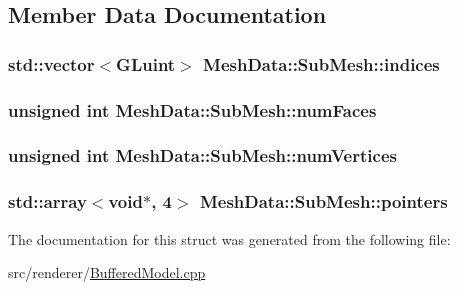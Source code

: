 \subsection{Member Data Documentation}
\hypertarget{structMeshData_1_1SubMesh_a3ddfe66733b41299f885428c38ab5bca}{
\subsubsection[{indices}]{\setlength{\rightskip}{0pt plus 5cm}std\-::vector$<${\bf G\-Luint}$>$ Mesh\-Data\-::\-Sub\-Mesh\-::indices}}\label{structMeshData_1_1SubMesh_a3ddfe66733b41299f885428c38ab5bca}
\hypertarget{structMeshData_1_1SubMesh_a7eb344d66f099df939c1f9b22a24470d}{
\subsubsection[{num\-Faces}]{\setlength{\rightskip}{0pt plus 5cm}unsigned int Mesh\-Data\-::\-Sub\-Mesh\-::num\-Faces}}\label{structMeshData_1_1SubMesh_a7eb344d66f099df939c1f9b22a24470d}
\hypertarget{structMeshData_1_1SubMesh_af8d61f18a35765e1103e5f68f1ad2dfa}{
\subsubsection[{num\-Vertices}]{\setlength{\rightskip}{0pt plus 5cm}unsigned int Mesh\-Data\-::\-Sub\-Mesh\-::num\-Vertices}}\label{structMeshData_1_1SubMesh_af8d61f18a35765e1103e5f68f1ad2dfa}
\hypertarget{structMeshData_1_1SubMesh_a82f8f81b976a144692e020e09598da3d}{
\subsubsection[{pointers}]{\setlength{\rightskip}{0pt plus 5cm}std\-::array$<$void$\ast$, 4$>$ Mesh\-Data\-::\-Sub\-Mesh\-::pointers}}\label{structMeshData_1_1SubMesh_a82f8f81b976a144692e020e09598da3d}


The documentation for this struct was generated from the following file\-:\begin{DoxyCompactItemize}
\item 
src/renderer/\hyperlink{BufferedModel_8cpp}{Buffered\-Model.\-cpp}\end{DoxyCompactItemize}
